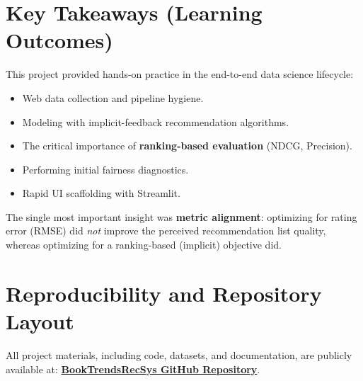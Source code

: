 \documentclass[11pt,a4paper]{article}
\begin{document}
\section{Key Takeaways (Learning Outcomes)}
This project provided hands-on practice in the end-to-end data science lifecycle:
\begin{itemize}
    \item Web data collection and pipeline hygiene.
    \item Modeling with implicit-feedback recommendation algorithms.
    \item The critical importance of \textbf{ranking-based evaluation} (NDCG, Precision).
    \item Performing initial fairness diagnostics.
    \item Rapid UI scaffolding with Streamlit.
\end{itemize}
The single most important insight was \textbf{metric alignment}: optimizing for rating error (RMSE) did \emph{not} improve the perceived recommendation list quality, whereas optimizing for a ranking-based (implicit) objective did.

\section{Reproducibility and Repository Layout}
All project materials, including code, datasets, and documentation, are publicly available at:  
\href{https://github.com/VillafuerTech/BookTrendsRecSys}{\textbf{BookTrendsRecSys GitHub Repository}}.
\end{document}
